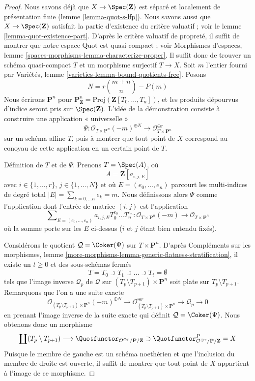 \begin{proof}
Nous savons déjà que $X \to \Spec(\mathbf{Z})$ est séparé et localement de
présentation finie (lemme \ref{lemma-quot-s-lfp}).
Nous savons aussi que $X \to \Spec(\mathbf{Z})$ satisfait la partie
d'existence du critère valuatif ; voir le lemme
\ref{lemma-quot-existence-part}.
D'après le critère valuatif de propreté, il suffit de montrer que notre
espace Quot est quasi-compact ; voir Morphismes d'espaces, lemme
\ref{spaces-morphisms-lemma-characterize-proper}.
Il suffit donc de trouver un schéma quasi-compact $T$ et un morphisme
surjectif $T \to X$. Soit $m$ l'entier fourni par Variétés, lemme
\ref{varieties-lemma-bound-quotients-free}. Posons
$$
N = r{m + n \choose n} - P(m)
$$
Nous écrirons $\mathbf{P}^n$ pour
$\mathbf{P}^n_\mathbf{Z} = \text{Proj}(\mathbf{Z}[T_0, \ldots, T_n])$,
et les produits dépourvus d'indice seront pris sur $\Spec(\mathbf{Z})$.
L'idée de la démonstration consiste à construire une application
« universelle »
$$
\Psi :
\mathcal{O}_{T \times \mathbf{P}^n}(-m)^{\oplus N}
\longrightarrow
\mathcal{O}_{T \times \mathbf{P}^n}^{\oplus r}
$$
sur un schéma affine $T$, puis à montrer que tout point de $X$ correspond
au conoyau de cette application en un certain point de $T$.

\medskip\noindent
Définition de $T$ et de $\Psi$. Prenons $T = \Spec(A)$, où
$$
A = \mathbf{Z}[a_{i, j, E}]
$$
avec $i \in \{1, \ldots, r\}$, $j \in \{1, \ldots, N\}$ et où
$E = (e_0, \ldots, e_n)$ parcourt les multi-indices de degré total
$|E| = \sum_{k = 0, \ldots n} e_k = m$.
Nous définissons alors $\Psi$ comme l'application dont l'entrée de matrice
$(i, j)$ est l'application
$$
\sum\nolimits_{E = (e_0, \ldots, e_n)}
a_{i, j, E} T_0^{e_0} \ldots T_n^{e_n} :
\mathcal{O}_{T \times \mathbf{P}^n}(-m)
\longrightarrow
\mathcal{O}_{T \times \mathbf{P}^n}
$$
où la somme porte sur les $E$ ci-dessus ($i$ et $j$ étant bien entendu
fixés).

\medskip\noindent
Considérons le quotient $\mathcal{Q} = \Coker(\Psi)$ sur
$T \times \mathbf{P}^n$. D'après Compléments sur les morphismes, lemme
\ref{more-morphisms-lemma-generic-flatness-stratification}, il existe un
$t \geq 0$ et des sous-schémas fermés
$$
T = T_0 \supset T_1 \supset \ldots \supset T_t = \emptyset
$$
tels que l'image inverse $\mathcal{Q}_p$ de $\mathcal{Q}$ sur
$(T_p \setminus T_{p + 1}) \times \mathbf{P}^n$ soit plate sur
$T_p \setminus T_{p + 1}$. Remarquons que l'on a une suite exacte
$$
\mathcal{O}_{(T_p \setminus T_{p + 1}) \times \mathbf{P}^n}(-m)^{\oplus N}
\to
\mathcal{O}_{(T_p \setminus T_{p + 1}) \times \mathbf{P}^n}^{\oplus r}
\to
\mathcal{Q}_p
\to
0
$$
en prenant l'image inverse de la suite exacte qui définit
$\mathcal{Q} = \Coker(\Psi)$. Nous obtenons donc un morphisme
$$
\coprod (T_p \setminus T_{p + 1})
\longrightarrow
\Quotfunctor_{\mathcal{O}^{\oplus r}/\mathbf{P}/\mathbf{Z}}
\supset
\Quotfunctor^P_{\mathcal{O}^{\oplus r}/\mathbf{P}/\mathbf{Z}} = X
$$
Puisque le membre de gauche est un schéma noethérien et que l'inclusion du
membre de droite est ouverte, il suffit de montrer que tout point de $X$
appartient à l'image de ce morphisme.


\end{proof}
